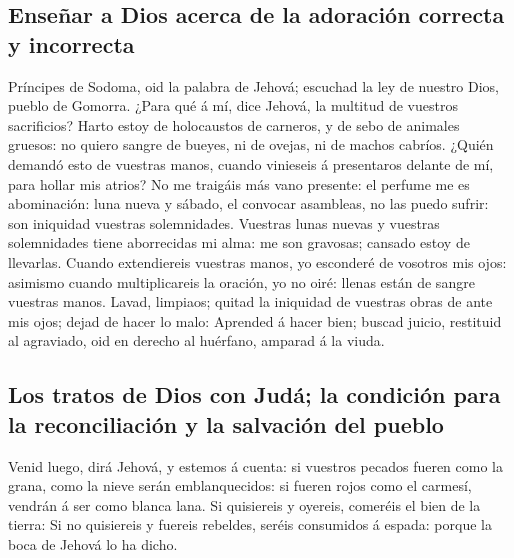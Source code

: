 \hypertarget{enseuxf1ar-a-dios-acerca-de-la-adoraciuxf3n-correcta-y-incorrecta}{%
\subsection{Enseñar a Dios acerca de la adoración correcta y
incorrecta}\label{enseuxf1ar-a-dios-acerca-de-la-adoraciuxf3n-correcta-y-incorrecta}}

 Príncipes de Sodoma, oid la palabra de Jehová; escuchad la
ley de nuestro Dios, pueblo de Gomorra.  ¿Para qué á mí,
dice Jehová, la multitud de vuestros sacrificios? Harto estoy de
holocaustos de carneros, y de sebo de animales gruesos: no quiero sangre
de bueyes, ni de ovejas, ni de machos cabríos.  ¿Quién
demandó esto de vuestras manos, cuando vinieseis á presentaros delante
de mí, para hollar mis atrios?  No me traigáis más vano
presente: el perfume me es abominación: luna nueva y sábado, el convocar
asambleas, no las puedo sufrir: son iniquidad vuestras solemnidades.
 Vuestras lunas nuevas y vuestras solemnidades tiene
aborrecidas mi alma: me son gravosas; cansado estoy de llevarlas.
 Cuando extendiereis vuestras manos, yo esconderé de
vosotros mis ojos: asimismo cuando multiplicareis la oración, yo no
oiré: llenas están de sangre vuestras manos.  Lavad,
limpiaos; quitad la iniquidad de vuestras obras de ante mis ojos; dejad
de hacer lo malo:  Aprended á hacer bien; buscad juicio,
restituid al agraviado, oid en derecho al huérfano, amparad á la viuda.

\hypertarget{los-tratos-de-dios-con-juduxe1-la-condiciuxf3n-para-la-reconciliaciuxf3n-y-la-salvaciuxf3n-del-pueblo}{%
\subsection{Los tratos de Dios con Judá; la condición para la
reconciliación y la salvación del
pueblo}\label{los-tratos-de-dios-con-juduxe1-la-condiciuxf3n-para-la-reconciliaciuxf3n-y-la-salvaciuxf3n-del-pueblo}}

 Venid luego, dirá Jehová, y estemos á cuenta: si vuestros
pecados fueren como la grana, como la nieve serán emblanquecidos: si
fueren rojos como el carmesí, vendrán á ser como blanca lana.
 Si quisiereis y oyereis, comeréis el bien de la tierra:
 Si no quisiereis y fuereis rebeldes, seréis consumidos á
espada: porque la boca de Jehová lo ha dicho.


